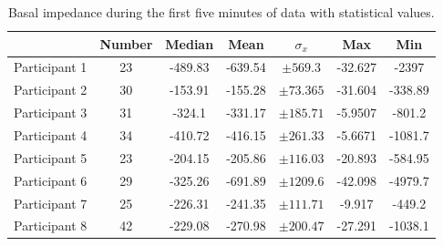\begin{table}[t]
	\caption{Basal impedance during the first five minutes of data with statistical values.}
	\label{tbl:blood_flow:region2}
	\centering
	\begin{tabu}{lcccccc}
		\hline
		& \textbf{Number} & \textbf{Median} & \textbf{Mean} & \textbf{$\sigma_x$} & \textbf{Max} & \textbf{Min} \\\hline
		Participant 1 &       23        &     -489.83     &    -639.54    &       $\pm 569.3$        & -32.627      & -2397        \\
		Participant 2 &       30        &     -153.91     &    -155.28    &       $\pm73.365$        & -31.604      & -338.89      \\
		Participant 3 &       31        &     -324.1      &    -331.17    &       $\pm185.71$        & -5.9507      & -801.2       \\
		Participant 4 &       34        &     -410.72     &    -416.15    &       $\pm261.33$        & -5.6671      & -1081.7      \\
		Participant 5 &       23        &     -204.15     &    -205.86    &       $\pm116.03$        & -20.893      & -584.95      \\
		Participant 6 &       29        &     -325.26     &    -691.89    &       $\pm1209.6$        & -42.098      & -4979.7      \\
		Participant 7 &       25        &     -226.31     &    -241.35    &       $\pm111.71$        & -9.917       & -449.2       \\
		Participant 8 &       42        &     -229.08     &    -270.98    &       $\pm200.47$        & -27.291      & -1038.1      \\\hline
	\end{tabu} 
\end{table}




